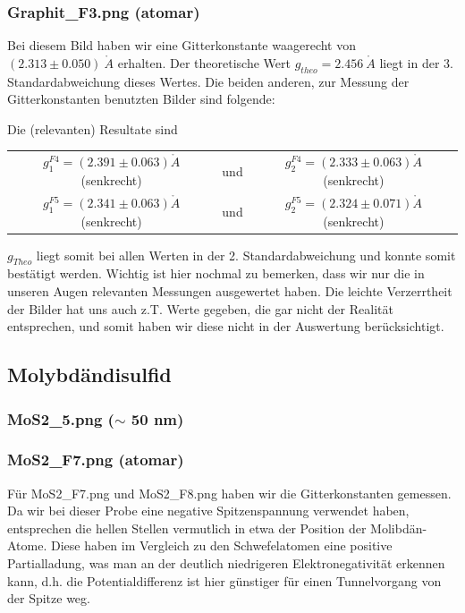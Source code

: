 \subsubsection{Graphit\_F3.png (atomar)}

Bei diesem Bild haben wir eine Gitterkonstante waagerecht von $(2.313 \pm 0.050)\ \mathring{A}$ erhalten. Der theoretische Wert $g_{theo}=2.456\ \mathring A$ liegt in der 3. Standardabweichung dieses Wertes. Die beiden anderen, zur Messung der Gitterkonstanten benutzten Bilder sind folgende:


Die (relevanten) Resultate sind\\

\begin{tabular}{c c c}
	$g^{F4}_1 = (2.391 \pm 0.063) \mathring{A}$ (senkrecht) & und & $g^{F4}_2 = (2.333 \pm 0.063) \mathring{A}$ (senkrecht)\\
	$g^{F5}_1 = (2.341 \pm 0.063) \mathring{A}$ (senkrecht) & und & $g^{F5}_2 = (2.324 \pm 0.071) \mathring{A}$ (senkrecht)\\
\end{tabular}


$g_{Theo}$ liegt somit bei allen Werten in der 2. Standardabweichung und konnte somit bestätigt werden. Wichtig ist hier nochmal zu bemerken, dass wir nur die in unseren Augen relevanten Messungen ausgewertet haben. Die leichte Verzerrtheit der Bilder hat uns auch z.T. Werte gegeben, die gar nicht der Realität entsprechen, und somit haben wir diese nicht in der Auswertung berücksichtigt.

\subsection{Molybdändisulfid}

\subsubsection{MoS2\_5.png ($\sim$ 50 nm)}
\subsubsection{MoS2\_F7.png (atomar)}

Für MoS2\_F7.png und MoS2\_F8.png haben wir die Gitterkonstanten gemessen. Da wir bei dieser Probe eine negative Spitzenspannung verwendet haben, entsprechen die hellen Stellen vermutlich in etwa der Position der Molibdän-Atome. Diese haben im Vergleich zu den Schwefelatomen eine positive Partialladung, was man an der deutlich niedrigeren Elektronegativität erkennen kann, d.h. die Potentialdifferenz ist hier günstiger für einen Tunnelvorgang von der Spitze weg.

